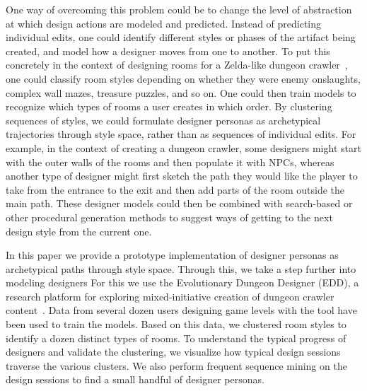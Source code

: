 One way of overcoming this problem could be to change the level of abstraction at which design actions are modeled and predicted. Instead of predicting individual edits, one could identify different styles or phases of the artifact being created, and model how a designer moves from one to another. To put this concretely in the context of designing rooms for a Zelda-like dungeon crawler~, one could classify room styles depending on whether they were enemy onslaughts, complex wall mazes, treasure puzzles, and so on. One could then train models to recognize which types of rooms a user creates in which order. By clustering sequences of styles, we could formulate designer personas as archetypical trajectories through style space, rather than as sequences of individual edits. For example, in the context of creating a dungeon crawler, some designers might start with the outer walls of the rooms and then populate it with NPCs, whereas another type of designer might first sketch the path they would like the player to take from the entrance to the exit and then add parts of the room outside the main path. These designer models could then be combined with search-based or other procedural generation methods to suggest ways of getting to the next design style from the current one. 

In this paper we provide a prototype implementation of designer personas as archetypical paths through style space. Through this, we take a step further into modeling designers  For this we use the Evolutionary Dungeon Designer (EDD), a research platform for exploring mixed-initiative creation of dungeon crawler content~. Data from several dozen users designing game levels with the tool have been used to train the models. Based on this data, we clustered room styles to identify a dozen distinct types of rooms. To understand the typical progress of designers and validate the clustering, we visualize how typical design sessions traverse the various clusters. We also perform frequent sequence mining on the design sessions to find a small handful of designer personas.







